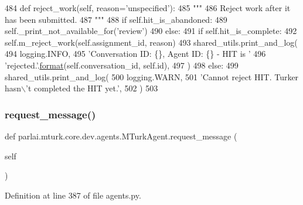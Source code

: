 \begin{DoxyCode}
484     \textcolor{keyword}{def }reject\_work(self, reason='unspecified'):
485         \textcolor{stringliteral}{"""}
486 \textcolor{stringliteral}{        Reject work after it has been submitted.}
487 \textcolor{stringliteral}{        """}
488         \textcolor{keywordflow}{if} self.hit\_is\_abandoned:
489             self.\_print\_not\_available\_for(\textcolor{stringliteral}{'review'})
490         \textcolor{keywordflow}{else}:
491             \textcolor{keywordflow}{if} self.hit\_is\_complete:
492                 self.m\_reject\_work(self.assignment\_id, reason)
493                 shared\_utils.print\_and\_log(
494                     logging.INFO,
495                     \textcolor{stringliteral}{'Conversation ID: \{\}, Agent ID: \{\} - HIT is '}
496                     \textcolor{stringliteral}{'rejected.'}.\hyperlink{namespaceparlai_1_1chat__service_1_1services_1_1messenger_1_1shared__utils_a32e2e2022b824fbaf80c747160b52a76}{format}(self.conversation\_id, self.id),
497                 )
498             \textcolor{keywordflow}{else}:
499                 shared\_utils.print\_and\_log(
500                     logging.WARN,
501                     \textcolor{stringliteral}{'Cannot reject HIT. Turker hasn\(\backslash\)'t completed the HIT yet.'},
502                 )
503 
\end{DoxyCode}
\mbox{\label{classparlai_1_1mturk_1_1core_1_1dev_1_1agents_1_1MTurkAgent_aac39e834ecff137bc0cfbb584c4d6c7f}} 
\subsubsection{\texorpdfstring{request\+\_\+message()}{request\_message()}}
{\footnotesize\ttfamily def parlai.\+mturk.\+core.\+dev.\+agents.\+M\+Turk\+Agent.\+request\+\_\+message (\begin{DoxyParamCaption}\item[{}]{self }\end{DoxyParamCaption})}



Definition at line 387 of file agents.\+py.


